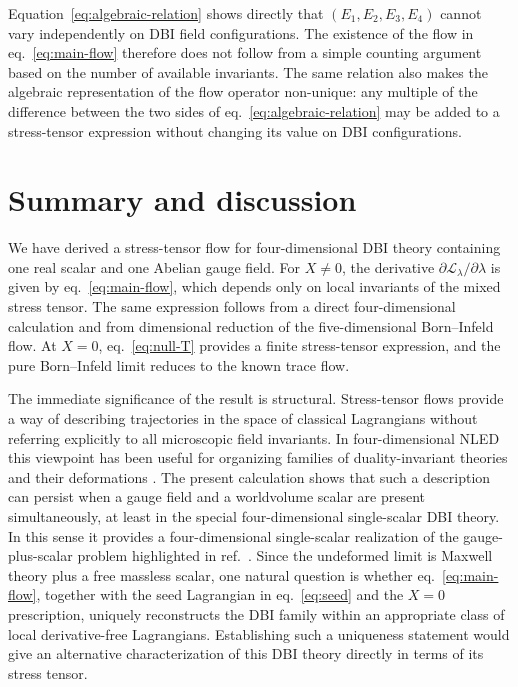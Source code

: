 \documentclass[a4paper,11pt]{article}
\numberwithin{equation}{section}
\newcommand{\Lag}{\mathcal L}
\begin{document}
Equation~\eqref{eq:algebraic-relation} shows directly that $(E_1,E_2,E_3,E_4)$ cannot vary independently on DBI field configurations. The existence of the flow in eq.~\eqref{eq:main-flow} therefore does not follow from a simple counting argument based on the number of available invariants. The same relation also makes the algebraic representation of the flow operator non-unique: any multiple of the difference between the two sides of eq.~\eqref{eq:algebraic-relation} may be added to a stress-tensor expression without changing its value on DBI configurations.

\section{Summary and discussion}
\label{sec:discussion}

We have derived a stress-tensor flow for four-dimensional DBI theory containing one real scalar and one Abelian gauge field. For $X\neq0$, the derivative $\partial\Lag_\lambda/\partial\lambda$ is given by eq.~\eqref{eq:main-flow}, which depends only on local invariants of the mixed stress tensor. The same expression follows from a direct four-dimensional calculation and from dimensional reduction of the five-dimensional Born--Infeld flow. At $X=0$, eq.~\eqref{eq:null-T} provides a finite stress-tensor expression, and the pure Born--Infeld limit reduces to the known trace flow.

The immediate significance of the result is structural. Stress-tensor flows provide a way of describing trajectories in the space of classical Lagrangians without referring explicitly to all microscopic field invariants. In four-dimensional NLED this viewpoint has been useful for organizing families of duality-invariant theories and their deformations \cite{Ferko2023Duality,Ferko2023Birefringence}. The present calculation shows that such a description can persist when a gauge field and a worldvolume scalar are present simultaneously, at least in the special four-dimensional single-scalar DBI theory. In this sense it provides a four-dimensional single-scalar realization of the gauge-plus-scalar problem highlighted in ref.~\cite{Ferko2024DBI}. Since the undeformed limit is Maxwell theory plus a free massless scalar, one natural question is whether eq.~\eqref{eq:main-flow}, together with the seed Lagrangian in eq.~\eqref{eq:seed} and the $X=0$ prescription, uniquely reconstructs the DBI family within an appropriate class of local derivative-free Lagrangians. Establishing such a uniqueness statement would give an alternative characterization of this DBI theory directly in terms of its stress tensor.
\end{document}
